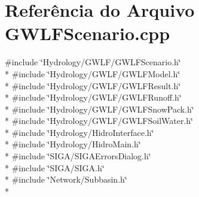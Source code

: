 \section{Referência do Arquivo G\+W\+L\+F\+Scenario.\+cpp}
\label{_g_w_l_f_scenario_8cpp}
{\ttfamily \#include \char`\"{}Hydrology/\+G\+W\+L\+F/\+G\+W\+L\+F\+Scenario.\+h\char`\"{}}\\*
{\ttfamily \#include \char`\"{}Hydrology/\+G\+W\+L\+F/\+G\+W\+L\+F\+Model.\+h\char`\"{}}\\*
{\ttfamily \#include \char`\"{}Hydrology/\+G\+W\+L\+F/\+G\+W\+L\+F\+Result.\+h\char`\"{}}\\*
{\ttfamily \#include \char`\"{}Hydrology/\+G\+W\+L\+F/\+G\+W\+L\+F\+Runoff.\+h\char`\"{}}\\*
{\ttfamily \#include \char`\"{}Hydrology/\+G\+W\+L\+F/\+G\+W\+L\+F\+Snow\+Pack.\+h\char`\"{}}\\*
{\ttfamily \#include \char`\"{}Hydrology/\+G\+W\+L\+F/\+G\+W\+L\+F\+Soil\+Water.\+h\char`\"{}}\\*
{\ttfamily \#include \char`\"{}Hydrology/\+Hidro\+Interface.\+h\char`\"{}}\\*
{\ttfamily \#include \char`\"{}Hydrology/\+Hidro\+Main.\+h\char`\"{}}\\*
{\ttfamily \#include \char`\"{}S\+I\+G\+A/\+S\+I\+G\+A\+Errors\+Dialog.\+h\char`\"{}}\\*
{\ttfamily \#include \char`\"{}S\+I\+G\+A/\+S\+I\+G\+A.\+h\char`\"{}}\\*
{\ttfamily \#include \char`\"{}Network/\+Subbasin.\+h\char`\"{}}\\*
